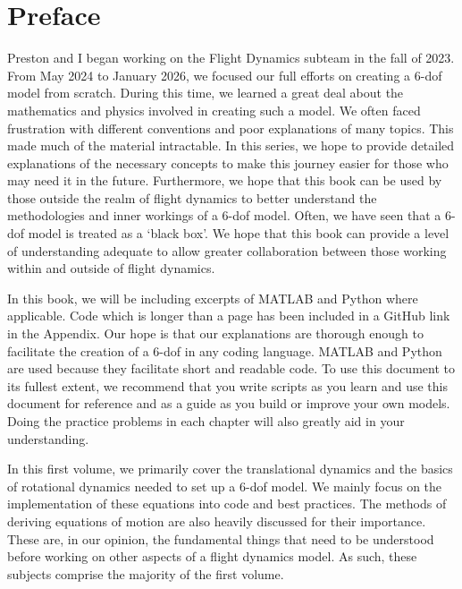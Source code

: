 \documentclass[10pt, openany, titlepage]{book}
\theoremstyle{definition}
\begin{document}





\chapter*{Preface}\label{sec:preface}
Preston and I began working on the Flight Dynamics subteam in the fall of 2023. From May 2024 to January 2026, we focused our full efforts on creating a 6-\gls{dof} model from scratch. During this time, we learned a great deal about the mathematics and physics involved in creating such a model. We often faced frustration with different conventions and poor explanations of many topics. This made much of the material intractable. In this series, we hope to provide detailed explanations of the necessary concepts to make this journey easier for those who may need it in the future. Furthermore, we hope that this book can be used by those outside the realm of flight dynamics to better understand the methodologies and inner workings of a 6-\gls{dof} model. Often, we have seen that a 6-\gls{dof} model is treated as a `black box'. We hope that this book can provide a level of understanding adequate to allow greater collaboration between those working within and outside of flight dynamics.

In this book, we will be including excerpts of MATLAB and Python where applicable. Code which is longer than a page has been included in a GitHub link in the Appendix. Our hope is that our explanations are thorough enough to facilitate the creation of a 6-\gls{dof} in any coding language. MATLAB and Python are used because they facilitate short and readable code. To use this document to its fullest extent, we recommend that you write scripts as you learn and use this document for reference and as a guide as you build or improve your own models. Doing the practice problems in each chapter will also greatly aid in your understanding.

In this first volume, we primarily cover the translational dynamics and the basics of rotational dynamics needed to set up a 6-\gls{dof} model. We mainly focus on the implementation of these equations into code and best practices. The methods of deriving equations of motion are also heavily discussed for their importance. These are, in our opinion, the fundamental things that need to be understood before working on other aspects of a flight dynamics model. As such, these subjects comprise the majority of the first volume.
\end{document}
